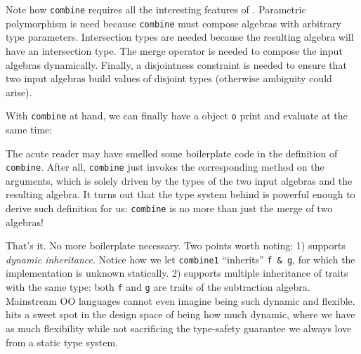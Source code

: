 
Note how \lstinline{combine} requires all the interesting features of \name.
Parametric polymorphism is need because \lstinline{combine} must compose algebras
with arbitrary type parameters. Intersection types are needed because the
resulting algebra will have an intersection type. The merge operator is needed
to compose the input algebras dynamically. Finally, a disjointness constraint is
needed to ensure that two input algebras build values of disjoint types
(otherwise ambiguity could arise).

With \lstinline{combine} at hand, we can finally have a object \lstinline{o}
print and evaluate at the same time:


The acute reader may have smelled some boilerplate code in the definition of
\lstinline{combine}. After all, \lstinline{combine} just invokes the
corresponding method on the arguments, which is solely driven by the types of
the two input algebras and the resulting algebra. It turns out that the type
system behind \name is powerful enough to derive such definition for us:
\lstinline{combine} is no more than just the merge of two algebras!


That's it. No more boilerplate necessary. Two points worth noting: 1) \name
supports \textit{dynamic inheritance}. Notice how we let \lstinline{combine1}
``inherits'' \lstinline{f & g}, for which the implementation is unknown
statically. 2) \name supports multiple inheritance of traits with the same type:
both \lstinline{f} and \lstinline{g} are traits of the subtraction algebra.
Mainstream OO languages cannot even imagine being such dynamic and flexible.
\name hits a sweet spot in the design space of being how much dynamic, where we
have as much flexibility while not sacrificing the type-safety guarantee we
always love from a static type system.
